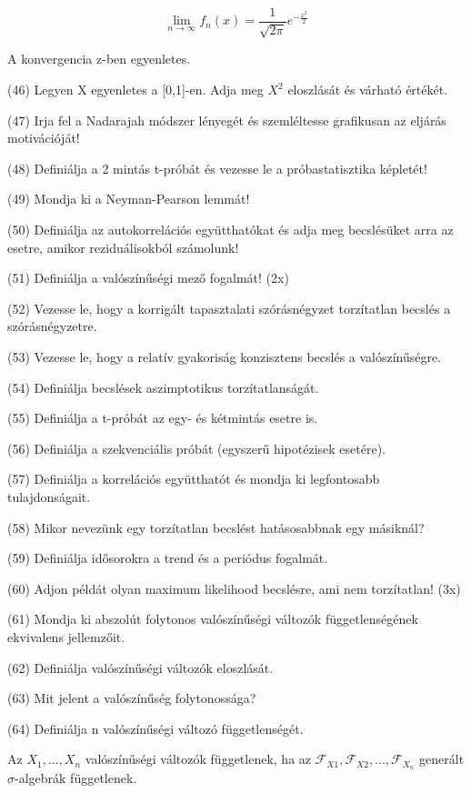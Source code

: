\documentclass[12p]{article}
\begin{document}
$$\lim_{n \rightarrow \infty} f_n(x) = \frac{1}{\sqrt{2\pi}} e^{- \frac{x^2}{2}}$$

A konvergencia z-ben egyenletes.

(46) Legyen X egyenletes a [0,1]-en. Adja meg $X^2$ eloszlását és várható értékét.

(47) Irja fel a Nadarajah módszer lényegét és szemléltesse grafikusan az eljárás motivációját! 

(48) Definiálja a 2 mintás t-próbát és vezesse le a próbastatisztika képletét! 

(49) Mondja ki a Neyman-Pearson lemmát!

(50) Definiálja az autokorrelációs együtthatókat és adja meg becslésüket arra az esetre, amikor reziduálisokból számolunk! 

(51) Definiálja a valószínűségi mező fogalmát! (2x)



(52) Vezesse le, hogy a korrigált tapasztalati szórásnégyzet torzítatlan becslés a szórásnégyzetre. 

(53) Vezesse le, hogy a relatív gyakoriság konzisztens becslés a valószínűségre.

(54) Definiálja becslések aszimptotikus torzítatlanságát.

(55) Definiálja a t-próbát az egy- és kétmintás esetre is.

(56) Definiálja a szekvenciális próbát (egyszerű hipotézisek esetére).

(57) Definiálja a korrelációs együtthatót és mondja ki legfontosabb tulajdonságait.

(58) Mikor nevezünk egy torzítatlan becslést hatásosabbnak egy másiknál?

(59) Definiálja idősorokra a trend és a periódus fogalmát.

(60) Adjon példát olyan maximum likelihood becslésre, ami nem torzítatlan! (3x)

(61) Mondja ki abszolút folytonos valószínűségi változók függetlenségének ekvivalens jellemzőit.

(62) Definiálja valószínűségi változók eloszlását.

(63) Mit jelent a valószínűség folytonossága?

(64) Definiálja n valószínűségi változó függetlenségét.

 Az $X_1,...,X_n$ valószínűségi változók függetlenek, ha az $\mathscr{F}_{X1}, \mathscr{F}_{X2} ,...,\mathscr{F}_{X_n}$ generált $\sigma$-algebrák függetlenek.
\end{document}
